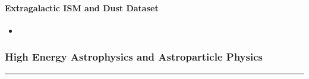 \documentclass[letterpaper,10pt,english]{sphinxmanual}
\begin{document}
\paragraph{Extragalactic ISM and Dust Dataset}
\label{\detokenize{resource/astro/topics/ism_and_dust:extragalactic-ism-and-dust-dataset}}\begin{itemize}
\item {} 

\end{itemize}


\subsubsection{High Energy Astrophysics and Astroparticle Physics}
\label{\detokenize{resource/astro/topics/high_energy_astrophy:high-energy-astrophysics-and-astroparticle-physics}}\label{\detokenize{resource/astro/topics/high_energy_astrophy::doc}}


\bigskip\hrule\bigskip
\end{document}
